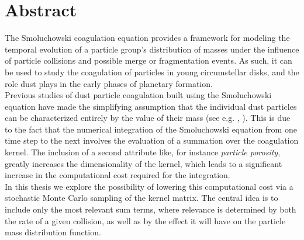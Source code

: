 \chapter*{Abstract}
\thispagestyle{NoHeader}

The Smoluchowski coagulation equation provides a framework for modeling the temporal evolution of 
a particle group's distribution of masses under the influence of particle collisions and 
possible merge or fragmentation events. 
As such, it can be used to study the coagulation of particles in young circumstellar disks,
and the role dust plays in the early phases of planetary formation. \\

Previous studies of dust particle coagulation built using the Smoluchowski equation have made the 
simplifying assumption that the individual dust particles can be characterized entirely by the 
value of their mass (see e.g. 
    \cite{birnstiel_dullemond_brauer_2010}, 
    \cite{dullemond_dominik_2004}). 
This is due to the fact that the numerical integration of the Smoluchowski equation from one 
time step to the next involves the evaluation of a summation over the coagulation kernel. 
The inclusion of a second attribute like, for instance \textit{particle porosity}, greatly 
increases the dimensionality of the kernel, which leads to a significant increase in the 
computational cost required for the integration. \\

In this thesis we explore the possibility of lowering this computational cost via a stochastic 
Monte Carlo sampling of the kernel matrix. The central idea is to include only the most 
relevant sum terms, where relevance is determined by both the rate of a given collision,  
as well as by the effect it will have on the particle mass distribution function. \\

 \\
 \\
 \\




